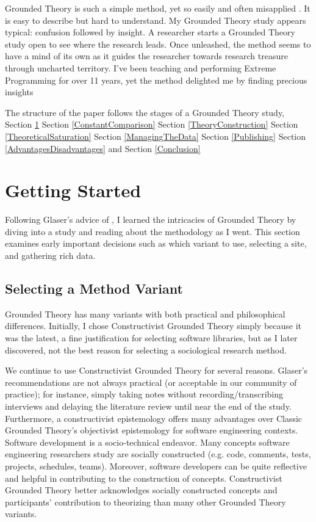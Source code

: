 Grounded Theory is such a simple method, yet so easily and often misapplied \cite{StolGroundedTheory}. It is easy to describe but hard to understand. My Grounded Theory study appears typical: confusion followed by insight. A researcher starts a Grounded Theory study open to see where the research leads. Once unleashed, the method seems to have a mind of its own as it guides the researcher towards research treasure through uncharted territory. I've been teaching and performing Extreme Programming for over 11 years, yet the method delighted me by finding precious insights 

The structure of the paper follows the stages of a Grounded Theory study, Section \ref{GettingStarted}  Section \ref{ConstantComparison}  Section \ref{TheoryConstruction}  Section \ref{TheoreticalSaturation}   Section \ref{ManagingTheData}   Section \ref{Publishing}  Section \ref{AdvantagesDisadvantages}  and  Section \ref{Conclusion} 
\section{Getting Started}
\label{GettingStarted}

Following Glaser's advice of  \cite{GlaserIssues}, I learned the intricacies of Grounded Theory by diving into a study and reading about the methodology as I went. This section examines early important decisions such as which variant to use, selecting a site, and gathering rich data.
\subsection{Selecting a Method Variant}
Grounded Theory has many variants with both practical and philosophical differences. Initially, I chose Constructivist Grounded Theory simply because it was the latest, a fine justification for selecting software libraries, but as I later discovered, not the best reason for selecting a sociological research method. 

We continue to use Constructivist Grounded Theory for several reasons. Glaser's recommendations are not always practical (or acceptable in our community of practice); for instance, simply taking notes without recording/transcribing interviews and delaying the literature review until near the end of the study. Furthermore, a constructivist epistemology offers many advantages over Classic Grounded Theory's objectivist epistemology for software engineering contexts. Software development is a socio-technical endeavor. Many concepts software engineering researchers study are socially constructed (e.g. code, comments, tests, projects, schedules, teams). Moreover, software developers can be quite reflective and helpful in contributing to the construction of concepts. Constructivist Grounded Theory better acknowledges socially constructed concepts and participants' contribution to theorizing than many other Grounded Theory variants. 

